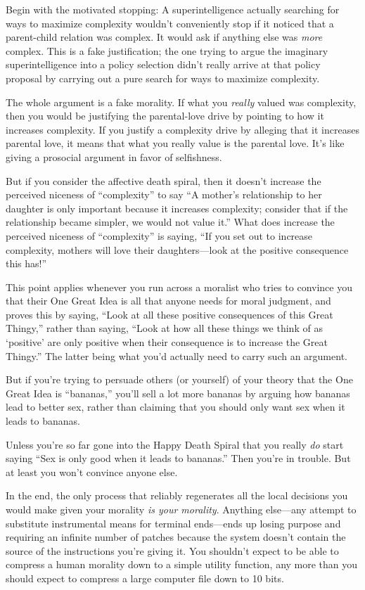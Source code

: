 {
 Begin with the motivated stopping: A superintelligence actually
searching for ways to maximize complexity wouldn't
conveniently stop if it noticed that a parent-child relation was
complex. It would ask if anything else was \textit{more} complex. This
is a fake justification; the one trying to argue the imaginary
superintelligence into a policy selection didn't really
arrive at that policy proposal by carrying out a pure search for ways
to maximize complexity.}

{
 The whole argument is a fake morality. If what you \textit{really}
valued was complexity, then you would be justifying the parental-love
drive by pointing to how it increases complexity. If you justify a
complexity drive by alleging that it increases parental love, it means
that what you really value is the parental love. It's
like giving a prosocial argument in favor of selfishness.}

{
 But if you consider the affective death spiral, then it
doesn't increase the perceived niceness of
``complexity'' to say
``A mother's relationship to her
daughter is only important because it increases complexity; consider
that if the relationship became simpler, we would not value
it.'' What does increase the perceived niceness of
``complexity'' is saying,
``If you set out to increase complexity, mothers will
love their daughters---look at the positive consequence this
has!''}

{
 This point applies whenever you run across a moralist who tries to
convince you that their One Great Idea is all that anyone needs for
moral judgment, and proves this by saying, ``Look at
all these positive consequences of this Great
Thingy,'' rather than saying, ``Look
at how all these things we think of as
`positive' are only positive when their
consequence is to increase the Great Thingy.'' The
latter being what you'd actually need to carry such an
argument.}

{
 But if you're trying to persuade others (or
yourself) of your theory that the One Great Idea is
``bananas,'' you'll
sell a lot more bananas by arguing how bananas lead to better sex,
rather than claiming that you should only want sex when it leads to
bananas.}

{
 Unless you're so far gone into the Happy Death
Spiral that you really \textit{do} start saying ``Sex
is only good when it leads to bananas.'' Then
you're in trouble. But at least you
won't convince anyone else.}

{
 In the end, the only process that reliably regenerates all the
local decisions you would make given your morality \textit{is your
morality}. Anything else---any attempt to substitute instrumental means
for terminal ends---ends up losing purpose and requiring an infinite
number of patches because the system doesn't contain
the source of the instructions you're giving it. You
shouldn't expect to be able to compress a human
morality down to a simple utility function, any more than you should
expect to compress a large computer file down to 10 bits.}

